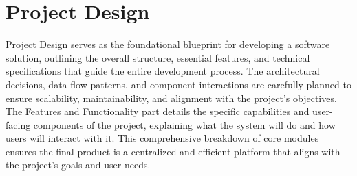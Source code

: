 \chapter{Project Design}
\vspace{-1cm}
\par Project Design serves as the foundational blueprint for developing a software solution, outlining the overall structure, essential features, and technical specifications that guide the entire development process. The architectural decisions, data flow patterns, and component interactions are carefully planned to ensure scalability, maintainability, and alignment with the project's objectives. The Features and Functionality part details the specific capabilities and user-facing components of the project, explaining what the system will do and how users will interact with it. This comprehensive breakdown of core modules ensures the final product is a centralized and efficient platform that aligns with the project's goals and user needs. 

